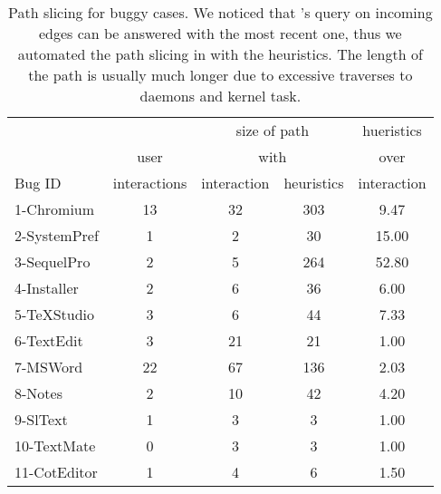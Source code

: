 %

\begin{table}[ht]
\footnotesize
\centering
  \begin{tabularx}{\columnwidth}{l|cccc}
  \hline
 	   &       &\multicolumn{2}{c}{size of path}& hueristics\\
       & user  & \multicolumn{2}{c}{with}  & over \\
Bug ID & interactions & interaction & heuristics  & interaction\\
\hline
\hline
1-Chromium  & 13 & 32 & 303 & 9.47\\
2-SystemPref & 1 & 2 & 30 & 15.00\\
3-SequelPro  & 2 & 5 & 264 & 52.80\\
4-Installer  & 2 & 6 & 36  & 6.00\\
5-TeXStudio  & 3 & 6 & 44  & 7.33\\
6-TextEdit  & 3 & 21 & 21 & 1.00\\
7-MSWord  & 22 & 67 & 136 & 2.03\\
8-Notes  & 2 & 10 & 42 & 4.20\\
9-SlText  & 1 & 3 & 3 & 1.00\\
10-TextMate  & 0 & 3 & 3 & 1.00\\
11-CotEditor  & 1 & 4 & 6 & 1.50\\
\hline
  \end{tabularx}
  \parbox{\columnwidth}
  {\caption{Path slicing for buggy cases. 
	We noticed that \xxx's query on incoming edges can be answered with the most
	recent one, thus we automated the path slicing in \xxx with the heuristics.
	The length of the path is usually much longer due to excessive traverses to
	daemons and kernel task.}
  \label{table:results}
  }
\end{table}


